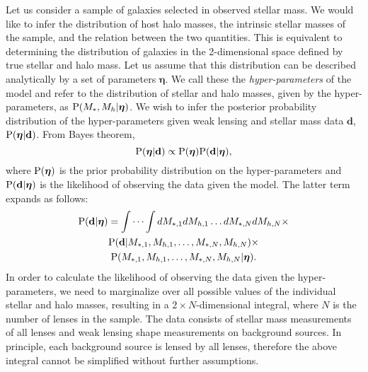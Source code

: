 \documentclass[usenatbib]{mnras}
\def\mstar{M_*}
\def\mhalo{M_{h}}
\def\hyperp{\boldsymbol{\eta}}
\def\data{\mathbf{d}}
\def\pr{{\rm P}}
\begin{document}
Let us consider a sample of galaxies selected in observed stellar mass. 
We would like to infer the distribution of host halo masses, the intrinsic stellar masses of the sample, and the relation between the two quantities. This is equivalent to determining the distribution of galaxies in the 2-dimensional space defined by true stellar and halo mass. 
Let us assume that this distribution can be described analytically by a set of parameters $\hyperp$. We call these the {\em hyper-parameters} of the model and refer to the distribution of stellar and halo masses, given by the hyper-parameters, as $\pr(\mstar, \mhalo | \hyperp)$. 
We wish to infer the posterior probability distribution of the hyper-parameters given weak lensing and stellar mass data $\data$, $\pr(\hyperp|\data)$.
From Bayes theorem,
%
\begin{equation}\label{eq:bayes1}
\pr(\hyperp|\data) \propto \pr(\hyperp)\pr(\data|\hyperp),
\end{equation}
where $\pr(\hyperp)$ is the prior probability distribution on the hyper-parameters and $\pr(\data|\hyperp)$ is the likelihood of observing the data given the model.
The latter term expands as follows:
\begin{multline}\label{eq:nasty}
\pr(\data|\hyperp) = \idotsint dM_{*,1} dM_{h,1}\ldots dM_{*,N} dM_{h,N} \times \\
\pr(\data|M_{*,1}, M_{h,1}, \ldots, M_{*,N}, M_{h,N}) \times \\
\pr(M_{*,1}, M_{h,1}, \ldots, M_{*,N}, M_{h,N}|\hyperp).
\end{multline}
In order to calculate the likelihood of observing the data given the hyper-parameters, we need to marginalize over all possible values of the individual stellar and halo masses, resulting in a $2\times N$-dimensional integral, where $N$ is the number of lenses in the sample.
The data consists of stellar mass measurements of all lenses and weak lensing shape measurements on background sources.
In principle, each background source is lensed by all lenses, therefore the above integral cannot be simplified without further assumptions.
\end{document}
